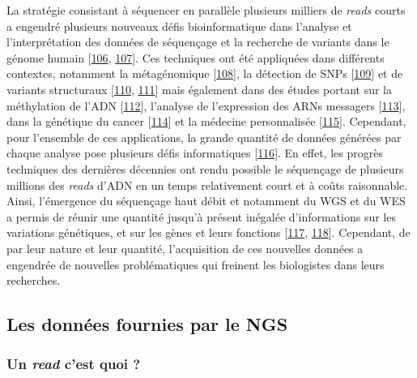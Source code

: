 \documentclass[12pt,twoside]{reedthesis}
\theoremstyle{definition}
\theoremstyle{definition}
\theoremstyle{remark}
\begin{document}
  La stratégie consistant à séquencer en parallèle plusieurs milliers de
  \emph{reads} courts a engendré plusieurs nouveaux défis bioinformatique
  dans l'analyse et l'interprétation des données de séquençage et la
  recherche de variants dans le génome humain
  {[}\protect\hyperlink{ref-Wold2007}{106},
  \protect\hyperlink{ref-Yang2009}{107}{]}. Ces techniques ont été
  appliquées dans différents contextes, notamment la métagénomique
  {[}\protect\hyperlink{ref-Qin2010}{108}{]}, la détection de SNPs
  {[}\protect\hyperlink{ref-VanTassell2008}{109}{]} et de variants
  structuraux {[}\protect\hyperlink{ref-Alkan2010}{110},
  \protect\hyperlink{ref-Medvedev2009}{111}{]} mais également dans des
  études portant sur la méthylation de l'ADN
  {[}\protect\hyperlink{ref-Taylor2007}{112}{]}, l'analyse de l'expression
  des ARNs messagers {[}\protect\hyperlink{ref-Sultan2008}{113}{]}, dans
  la génétique du cancer {[}\protect\hyperlink{ref-Guffanti2009}{114}{]}
  et la médecine personnalisée
  {[}\protect\hyperlink{ref-Auffray2009}{115}{]}. Cependant, pour
  l'ensemble de ces applications, la grande quantité de données générées
  par chaque analyse pose plusieurs défis informatiques
  {[}\protect\hyperlink{ref-Horner2009}{116}{]}. En effet, les progrès
  techniques des dernières décennies ont rendu possible le séquençage de
  plusieurs millions des \emph{reads} d'ADN en un temps relativement court
  et à coûts raisonnable. Ainsi, l'émergence du séquençage haut débit et
  notamment du WGS et du WES a permis de réunir une quantité jusqu'à
  présent inégalée d'informations sur les variations génétiques, et sur
  les gènes et leurs fonctions {[}\protect\hyperlink{ref-Mardis2008}{117},
  \protect\hyperlink{ref-Bentley2006}{118}{]}. Cependant, de par leur
  nature et leur quantité, l'acquisition de ces nouvelles données a
  engendrée de nouvelles problématiques qui freinent les biologistes dans
  leurs recherches.
  
  \subsection{Les données fournies par le
  NGS}\label{les-donnees-fournies-par-le-ngs}
  
  \subsubsection{\texorpdfstring{Un \emph{read} c'est quoi
  ?}{Un read c'est quoi ?}}\label{un-read-cest-quoi}
  
\end{document}
